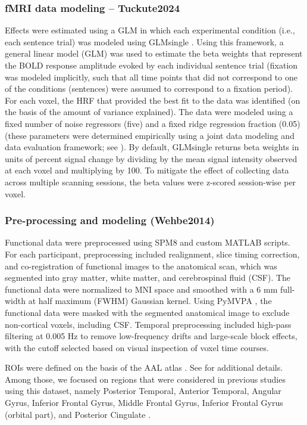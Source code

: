 \documentclass[11pt]{article}
\begin{document}
\subsubsection{fMRI data modeling -- Tuckute2024} \label{sec:appendix-control-modeling}
Effects were estimated using a GLM in which each experimental condition (i.e., each sentence trial) was modeled using GLMsingle \citep{prince2022glmsingle}. Using this framework, a general linear model (GLM) was used to estimate the beta weights that represent the BOLD response amplitude evoked by each individual sentence trial (fixation was modeled implicitly, such that all time points that did not correspond to one of the conditions (sentences) were assumed to correspond to a fixation period). For each voxel, the HRF that provided the best fit to the data was identified (on the basis of the amount of variance explained). The data were modeled using a fixed number of noise regressors (five) and a fixed ridge regression fraction (0.05) (these parameters were determined empirically using a joint data modeling and data evaluation framework; see \citealp{tuckute2023driving}). By default, GLMsingle returns beta weights in units of percent signal change by dividing by the mean signal intensity observed at each voxel and multiplying by 100. To mitigate the effect of collecting data across multiple scanning sessions, the beta values were z-scored session-wise per voxel.

\subsubsection{Pre-processing and modeling (Wehbe2014)}

Functional data were preprocessed using SPM8 and custom MATLAB scripts. For each participant, preprocessing included realignment, slice timing correction, and co-registration of functional images to the anatomical scan, which was segmented into gray matter, white matter, and cerebrospinal fluid (CSF). The functional data were normalized to MNI space and smoothed with a 6 mm full-width at half maximum (FWHM) Gaussian kernel. Using PyMVPA \citep{hanke2009pymvpa}, the functional data were masked with the segmented anatomical image to exclude non-cortical voxels, including CSF. Temporal preprocessing included high-pass filtering at 0.005 Hz to remove low-frequency drifts and large-scale block effects, with the cutoff selected based on visual inspection of voxel time courses.

ROIs were defined on the basis of the AAL atlas \citep{tzourio2002automated}. See \citet{hp_fmri} for additional details. Among those, we focused on regions that were considered in previous studies using this dataset, namely Posterior Temporal, Anterior Temporal, Angular Gyrus, Inferior Frontal Gyrus, Middle Frontal Gyrus, Inferior Frontal Gyrus (orbital part), and Posterior Cingulate \citep{aw2022training, merlin2024language}. 
\end{document}
